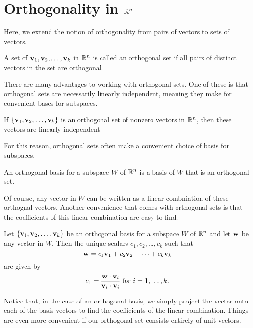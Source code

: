 \documentclass[../m73main.tex]{subfiles}
\begin{document}
\section{Orthogonality in $\mathbb{R}^n$}
Here, we extend the notion of orthogonality from pairs of vectors to sets of vectors.

\begin{definition}
	A set of $\mathbf{v}_1, \mathbf{v}_2, \ldots, \mathbf{v}_k$ in $\mathbb{R}^n$ is called an orthogonal set if all pairs of distinct vectors in the set are orthogonal. 
\end{definition}

There are many advantages to working with orthogonal sets.
One of these is that orthogonal sets are necessarily linearly independent, meaning they make for convenient bases for subspaces.

\begin{theorem}
	If $\{\mathbf{v}_1, \mathbf{v}_2, \ldots, \mathbf{v}_k\}$ is an orthogonal set of nonzero vectors in $\mathbb{R}^n$, then these vectors are linearly independent.
\end{theorem}

For this reason, orthogonal sets often make a convenient choice of basis for subspaces.

\begin{definition}
	An orthogonal basis for a subspace $W$ of $\mathbb{R}^n$ is a basis of $W$ that is an orthogonal set.
\end{definition}

Of course, any vector in $W$ can be written as a linear combniation of these orthognal vectors.
Another convenience that comes with orthogonal sets is that the coefficients of this linear combination are easy to find.

\begin{theorem}
	Let $\{\mathbf{v}_1, \mathbf{v}_2, \ldots, \mathbf{v}_k\}$ be an orthogonal basis for a subspace $W$ of $\mathbb{R}^n$ and let $\mathbf{w}$ be any vector in $W$.
	Then the unique scalars $c_1, c_2, \ldots, c_k$ such that
	\[ \mathbf{w} = c_1 \mathbf{v}_1 + c_2 \mathbf{v}_2 + \cdots + c_k \mathbf{v}_k \]
	are given by
	\[ c_1 = \frac{\mathbf{w} \cdot \mathbf{v}_i}{\mathbf{v}_i \cdot \mathbf{v}_i} \text{ for } i = 1, \ldots, k. \]
\end{theorem}

Notice that, in the case of an orthogonal basis, we simply project the vector onto each of the basis vectors to find the coefficients of the linear combination.
Things are even more convenient if our orthogonal set consists entirely of unit vectors.
\end{document}
